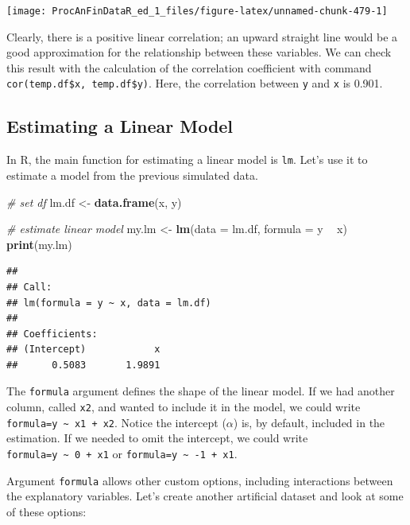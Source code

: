 \documentclass[11pt,]{book}
\newenvironment{Shaded}{\begin{snugshade}}{\end{snugshade}}
\newcommand{\KeywordTok}[1]{\textcolor[rgb]{0.27,0.27,0.27}{\textbf{#1}}}
\newcommand{\DataTypeTok}[1]{\textcolor[rgb]{0.27,0.27,0.27}{#1}}
\newcommand{\StringTok}[1]{\textcolor[rgb]{0.5,0.5,0.5}{#1}}
\newcommand{\CommentTok}[1]{\textcolor[rgb]{0.56,0.35,0.01}{\textit{#1}}}
\newcommand{\OperatorTok}[1]{\textcolor[rgb]{0.81,0.36,0.00}{\textbf{#1}}}
\newcommand{\NormalTok}[1]{#1}
\begin{document}
\begin{center}\texttt{[image: ProcAnFinDataR\_ed\_1\_files/figure-latex/unnamed-chunk-479-1]} \end{center}

Clearly, there is a positive linear correlation; an upward straight line
would be a good approximation for the relationship between these
variables. We can check this result with the calculation of the
correlation coefficient with command
\texttt{cor(temp.df\$x,\ temp.df\$y)}. Here, the correlation between
\texttt{y} and \texttt{x} is 0.901.

\subsection{Estimating a Linear Model}\label{estimating-ols}

In R, the main function for estimating a linear model is \texttt{lm}.
Let's use it to estimate a model from the previous simulated data.

\begin{Shaded}
\begin{Highlighting}[]
\CommentTok{# set df}
\NormalTok{lm.df <-}\StringTok{ }\KeywordTok{data.frame}\NormalTok{(x, y)}

\CommentTok{# estimate linear model}
\NormalTok{my.lm <-}\StringTok{ }\KeywordTok{lm}\NormalTok{(}\DataTypeTok{data =}\NormalTok{ lm.df, }\DataTypeTok{formula =}\NormalTok{ y }\OperatorTok{~}\StringTok{ }\NormalTok{x)}
\KeywordTok{print}\NormalTok{(my.lm)}
\end{Highlighting}
\end{Shaded}

\begin{verbatim}
## 
## Call:
## lm(formula = y ~ x, data = lm.df)
## 
## Coefficients:
## (Intercept)            x  
##      0.5083       1.9891
\end{verbatim}

The \texttt{formula} argument defines the shape of the linear model. If
we had another column, called \texttt{x2}, and wanted to include it in
the model, we could write
\texttt{formula=y\ \textasciitilde{}\ x1\ +\ x2}. Notice the intercept
(\(\alpha\)) is, by default, included in the estimation. If we needed to
omit the intercept, we could write
\texttt{formula=y\ \textasciitilde{}\ 0\ +\ x1} or
\texttt{formula=y\ \textasciitilde{}\ -1\ +\ x1}.

Argument \texttt{formula} allows other custom options, including
interactions between the explanatory variables. Let's create another
artificial dataset and look at some of these options:
\end{document}
